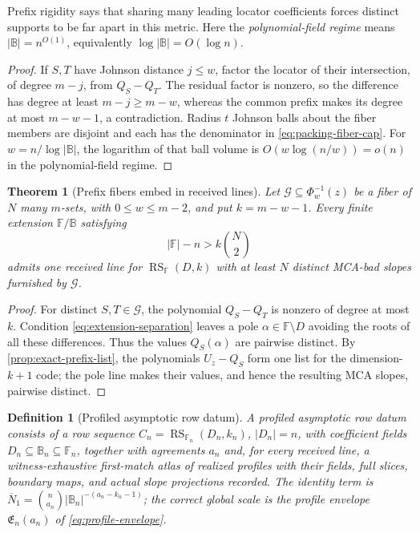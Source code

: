\documentclass[12pt,a4paper]{amsart}
\numberwithin{equation}{section}
\newtheorem{theorem}{Theorem}[section]
\newtheorem{definition}[definition]{Definition}
\theoremstyle{remark}
\DeclareMathOperator{\RS}{RS}
\newcommand{\F}{\mathbb F}
\newcommand{\B}{\mathbb B}
\newcommand{\barN}{\overline N}
\newcommand{\abs}[1]{\lvert #1\rvert}
\begin{document}
Prefix rigidity says that sharing many leading locator coefficients forces
distinct supports to be far apart in this metric.  Here the
\emph{polynomial-field regime} means \(\abs\B=n^{O(1)}\), equivalently
\(\log\abs\B=O(\log n)\).

\begin{proof}
If \(S,T\) have Johnson distance \(j\le w\), factor the locator of their
intersection, of degree \(m-j\), from \(Q_S-Q_T\).  The residual factor is
nonzero, so the difference has degree at least \(m-j\ge m-w\), whereas the
common prefix makes its degree at most \(m-w-1\), a contradiction.  Radius
\(t\) Johnson balls about the fiber members are disjoint and each has the
denominator in \eqref{eq:packing-fiber-cap}.  For
\(w=n/\log\abs\B\), the logarithm of that ball volume is
\(O(w\log(n/w))=o(n)\) in the polynomial-field regime.
\end{proof}

\begin{theorem}[Prefix fibers embed in received lines]
\label{thm:prefix-to-line-hardness}
Let \(\mathcal G\subseteq\Phi_w^{-1}(z)\) be a fiber of \(N\) many
\(m\)-sets, with \(0\le w\le m-2\), and put \(k=m-w-1\).  Every finite
extension \(\F/\B\) satisfying
\[
        \abs\F-n>k\binom N2
        \tag{4.5}\label{eq:extension-separation}
\]
admits one received line for \(\RS_\F(D,k)\) with at least \(N\) distinct
MCA-bad slopes furnished by \(\mathcal G\).
\end{theorem}

\begin{proof}
For distinct \(S,T\in\mathcal G\), the polynomial \(Q_S-Q_T\) is nonzero
of degree at most \(k\).  Condition \eqref{eq:extension-separation} leaves a
pole \(\alpha\in\F\setminus D\) avoiding the roots of all these
differences.  Thus the values \(Q_S(\alpha)\) are pairwise distinct.  By
\cref{prop:exact-prefix-list}, the polynomials \(U_z-Q_S\) form one list for
the dimension-\(k+1\) code; the pole line makes their values, and hence the
resulting MCA slopes, pairwise distinct.
\end{proof}

\begin{definition}[Profiled asymptotic row datum]
\label{def:asymptotic-row}
A \emph{profiled asymptotic row datum} consists of a row sequence
\(C_n=\RS_{\F_n}(D_n,k_n)\), \(\abs{D_n}=n\), with coefficient fields
\(D_n\subseteq\B_n\subseteq\F_n\), together with agreements \(a_n\)
and, for every received line, a witness-exhaustive first-match atlas of
realized profiles with their fields, full slices, boundary maps, and actual
slope projections recorded.  The identity term is
\(\barN_1=\binom n{a_n}\abs{\B_n}^{-(a_n-k_n-1)}\); the correct global
scale is the profile envelope \(\mathfrak E_n(a_n)\) of
\eqref{eq:profile-envelope}.
\end{definition}
\end{document}
